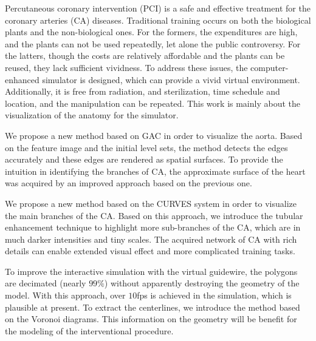 
\begin{englishabstract}

Percutaneous coronary intervention (PCI) is a safe and effective treatment for the coronary arteries (CA) diseases.
Traditional training occurs on both the biological plants and the non-biological ones. 
For the formers, the expenditures are high, and the plants can not be used repeatedly, let alone the public controversy. 
For the latters, though the costs are relatively affordable and the plants can be reused, they lack sufficient vividness. 
To address these issues, the computer-enhanced simulator is designed, which can provide a vivid virtual environment.
Additionally, it is free from radiation, and sterilization, time schedule and location, and the manipulation can be repeated. 
This work is mainly about the visualization of the anatomy for the simulator.

We propose a new method based on GAC in order to visualize the aorta.
Based on the feature image and the initial level sets, the method detects the edges accurately and these edges are rendered as spatial surfaces. 
To provide the intuition in identifying the branches of CA, the approximate surface of the heart was acquired by an improved approach based on the previous one. 

We propose a new method based on the CURVES system in order to visualize the main branches of the CA. 
Based on this approach, we introduce the tubular enhancement technique to highlight more sub-branches of the CA, which are in much darker intensities and tiny scales.
The acquired network of CA with rich details can enable extended visual effect and more complicated training tasks.

To improve the interactive simulation with the virtual guidewire, the polygons are decimated (nearly $99 \%$) without apparently destroying the geometry of the model.
With this approach, over $10$fps is achieved in the simulation, which is plausible at present.
To extract the centerlines, we introduce the method based on the Voronoi diagrams. 
This information on the geometry will be benefit for the modeling of the interventional procedure.

%
\end{englishabstract}
